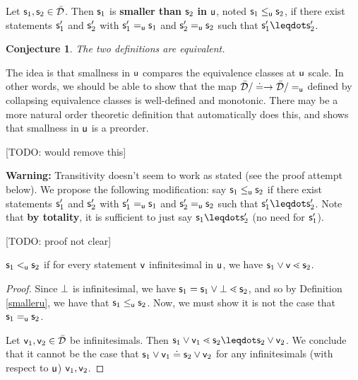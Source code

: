 \documentclass[10pt, onecolumn, nofootinbib]{revtex4-2}
\newtheorem{conj}[equation]{Conjecture}
\begin{document}
\begin{defn}\label{smalleru2}
	Let $\stmt_1, \stmt_2 \in \tdomain$. Then $\stmt_1$ is \textbf{smaller than} $\stmt_2$ \textbf{in} $\stmt[u]$, noted $\stmt_1 \lequ \stmt_2$, if there exist statements $\stmt_1'$ and $\stmt_2'$ with $\stmt_1'\equ\stmt_1$ and $\stmt_2'\equ\stmt_2$ such that $\stmt_1'\finer\stmt_2'$.
\end{defn}

\begin{conj}
	The two definitions are equivalent.
\end{conj}

\begin{remark}
	The idea is that smallness in $\stmt[u]$ compares the equivalence classes at $\stmt[u]$ scale. In other words, we should be able to show that the map $\tdomain / \eqgran \to \tdomain / \equ$ defined by collapsing equivalence classes is well-defined and monotonic. There may be a more natural order theoretic definition that automatically does this, and shows that smallness in $\stmt[u]$ is a preorder.
\end{remark}

[TODO: would remove this]

{\bf Warning:} Transitivity doesn't seem to work as stated (see the proof attempt below). We propose the following modification: say $\stmt_1\lequ\stmt_2$ if there exist statements $\stmt_1'$ and $\stmt_2'$ with $\stmt_1'\equ\stmt_1$ and $\stmt_2'\equ\stmt_2$ such that $\stmt_1'\finer\stmt_2'$. Note that {\bf by totality}, it is sufficient to just say $\stmt_1\finer\stmt_2'$ (no need for $\stmt_1'$). 

[TODO: proof not clear]

\begin{prop}
	$\stmt_1 \leu \stmt_2$ if for every statement $\stmt[v]$ infinitesimal in $\stmt[u]$, we have $\stmt_1\OR\stmt[v] \sfiner \stmt_2$. 
\end{prop}
\begin{proof}
	Since $\impossibility$ is infinitesimal, we have $\stmt_1 = \stmt_1\OR\impossibility \sfiner \stmt_2$, and so by Definition \ref{smalleru}, we have that $\stmt_1\lequ\stmt_2$. Now, we must show it is not the case that $\stmt_1\equ \stmt_2$. 
	
	Let $\stmt[v]_1,\stmt[v]_2\in\tdomain$ be infinitesimals. Then $\stmt_1\OR\stmt[v]_1 \sfiner \stmt_2 \finer\stmt_2\OR\stmt[v]_2$. We conclude that it cannot be the case that $\stmt_1 \OR \stmt[v]_1 \eqgran \stmt_2 \OR \stmt[v]_2$ for any infinitesimals (with respect to $\stmt[u]$) $\stmt[v]_1,\stmt[v]_2$. 
\end{proof}
\end{document}
